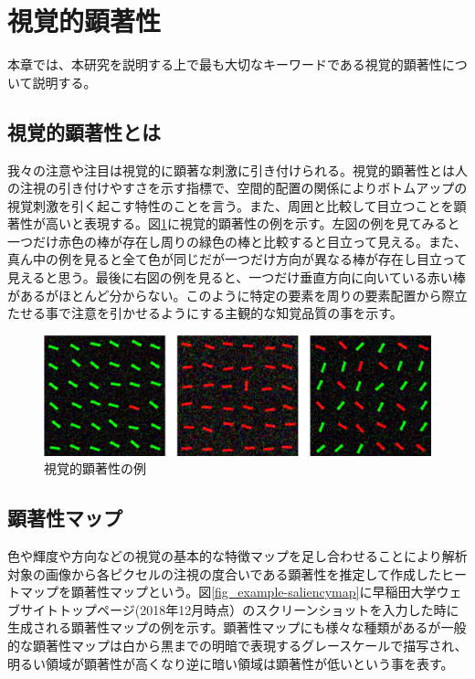 \newpage
\renewcommand{\baselinestretch}{1.5}
\section{視覚的顕著性}\label{sec:visula_saliency}
\renewcommand{\baselinestretch}{1}
\par 本章では、本研究を説明する上で最も大切なキーワードである視覚的顕著性について説明する。

\subsection{視覚的顕著性とは}
\par 我々の注意や注目は視覚的に顕著な刺激に引き付けられる。視覚的顕著性とは人の注視の引き付けやすさを示す指標で、空間的配置の関係によりボトムアップの視覚刺激を引く起こす特性のことを言う。また、周囲と比較して目立つことを顕著性が高いと表現する。図\ref{fig_whats-saliency}に視覚的顕著性の例を示す。左図の例を見てみると一つだけ赤色の棒が存在し周りの緑色の棒と比較すると目立って見える。また、真ん中の例を見ると全て色が同じだが一つだけ方向が異なる棒が存在し目立って見えると思う。最後に右図の例を見ると、一つだけ垂直方向に向いている赤い棒があるがほとんど分からない。このように特定の要素を周りの要素配置から際立たせる事で注意を引かせるようにする主観的な知覚品質の事を示す\cite{Itti:2007}。

\begin{figure}[H]
    \centering
    \includegraphics[width=12cm]{figures/whats-saliency.png}
    \caption{視覚的顕著性の例\cite{Itti:2007}}
    \label{fig_whats-saliency}
\end{figure}

\subsection{顕著性マップ}\label{subsec:saliency_map}
\par 色や輝度や方向などの視覚の基本的な特徴マップを足し合わせることにより解析対象の画像から各ピクセルの注視の度合いである顕著性を推定して作成したヒートマップを顕著性マップという。図\ref{fig_example-saliencymap}に早稲田大学ウェブサイトトップページ(2018年12月時点）\cite{waseda_top}のスクリーンショットを入力した時に生成される顕著性マップの例を示す。顕著性マップにも様々な種類があるが一般的な顕著性マップは白から黒までの明暗で表現するグレースケールで描写され、明るい領域が顕著性が高くなり逆に暗い領域は顕著性が低いという事を表す。

